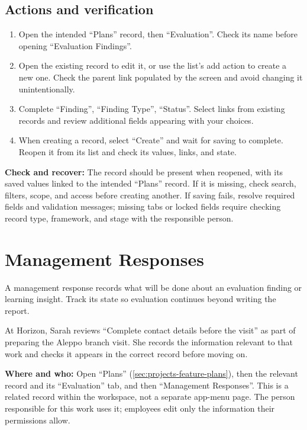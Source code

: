 \subsection{Actions and verification}
\begin{enumerate}
\item Open the intended “Plans” record, then “Evaluation”. Check its name before opening “Evaluation Findings”.
\item Open the existing record to edit it, or use the list's add action to create a new one. Check the parent link populated by the screen and avoid changing it unintentionally.
\item Complete “Finding”, “Finding Type”, “Status”. Select links from existing records and review additional fields appearing with your choices.
\item When creating a record, select “Create” and wait for saving to complete. Reopen it from its list and check its values, links, and state.
\end{enumerate}

\textbf{Check and recover:} The record should be present when reopened, with its saved values linked to the intended “Plans” record. If it is missing, check search, filters, scope, and access before creating another. If saving fails, resolve required fields and validation messages; missing tabs or locked fields require checking record type, framework, and stage with the responsible person.

\clearpage
\section{Management Responses}
\label{sec:projects-feature-planning-management-responses}

A management response records what will be done about an evaluation finding or learning insight. Track its state so evaluation continues beyond writing the report.

\begin{rcnote}
At Horizon, Sarah reviews “Complete contact details before the visit” as part of preparing the Aleppo branch visit. She records the information relevant to that work and checks it appears in the correct record before moving on.
\end{rcnote}

\textbf{Where and who:} Open “Plans” (\ref{sec:projects-feature-plans}), then the relevant record and its “Evaluation” tab, and then “Management Responses”. This is a related record within the workspace, not a separate app-menu page. The person responsible for this work uses it; employees edit only the information their permissions allow.

